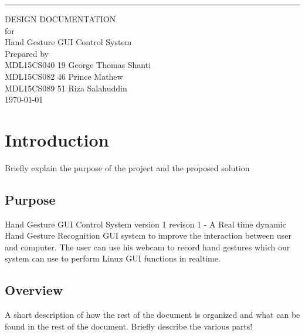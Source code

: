 \documentclass{scrreprt}
\date{}
\begin{document}
\begin{flushright}
    \rule{16cm}{5pt}\vskip1cm
    \begin{bfseries}
        \Huge{DESIGN DOCUMENTATION}\\
        \vspace{1.9cm}
        for\\
        \vspace{1.9cm}
        Hand Gesture GUI Control System\\
        \vspace{1.9cm}
        \LARGE
        Prepared by \\MDL15CS040 19 George Thomas Shanti
        \\MDL15CS082 46 Prince Mathew
        \\MDL15CS089 51 Riza Salahuddin\\
        \vspace{1.9cm}
        \today\\
    \end{bfseries}
\end{flushright}

\tableofcontents


\chapter{Introduction}
Briefly explain the purpose of the project and the proposed solution
\section{Purpose}
Hand Gesture GUI Control System version 1 revison 1 - A Real time dynamic Hand Gesture Recognition GUI system to improve the interaction between user and computer. The user can use his webcam to record hand gestures which our system can use to perform Linux GUI functions in realtime.

\section{Overview}
  A short description of how the rest of the document is organized and what can be 
  found in the rest of the document.
  Briefly describe the various parts!
\end{document}
